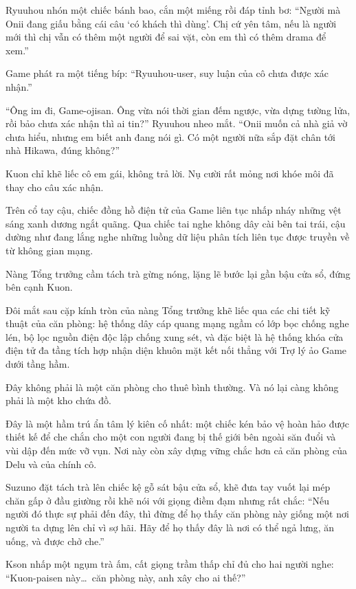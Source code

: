 ﻿\documentclass[../main.tex]{subfiles}
\begin{document}
Ryuuhou nhón một chiếc bánh bao, cắn một miếng rồi đáp tỉnh bơ: ``Người mà Onii đang giấu bằng cái câu `có khách thì dùng'. Chị cứ yên tâm, nếu là người mới thì chị vẫn có thêm một người để sai vặt, còn em thì có thêm drama để xem.''

Game phát ra một tiếng bíp: ``Ryuuhou-user, suy luận của cô chưa được xác nhận.''

``Ông im đi, Game-ojisan. Ông vừa nói thời gian đếm ngược, vừa dựng tường lửa, rồi bảo chưa xác nhận thì ai tin?'' Ryuuhou nheo mắt. ``Onii muốn cả nhà giả vờ chưa hiểu, nhưng em biết anh đang nói gì. Có một người nữa sắp đặt chân tới nhà Hikawa, đúng không?''

Kuon chỉ khẽ liếc cô em gái, không trả lời. Nụ cười rất mỏng nơi khóe môi đã thay cho câu xác nhận.

Trên cổ tay cậu, chiếc đồng hồ điện tử của Game liên tục nhấp nháy những vệt sáng xanh dương ngắt quãng. Qua chiếc tai nghe không dây cài bên tai trái, cậu dường như đang lắng nghe những luồng dữ liệu phân tích liên tục được truyền về từ không gian mạng.

Nàng Tổng trưởng cầm tách trà gừng nóng, lặng lẽ bước lại gần bậu cửa sổ, đứng bên cạnh Kuon.

Đôi mắt sau cặp kính tròn của nàng Tổng trưởng khẽ liếc qua các chi tiết kỹ thuật của căn phòng: hệ thống dây cáp quang mạng ngầm có lớp bọc chống nghe lén, bộ lọc nguồn điện độc lập chống xung sét, và đặc biệt là hệ thống khóa cửa điện tử đa tầng tích hợp nhận diện khuôn mặt kết nối thẳng với Trợ lý ảo Game dưới tầng hầm.

Đây không phải là một căn phòng cho thuê bình thường. Và nó lại càng không phải là một kho chứa đồ.

Đây là một hầm trú ẩn tâm lý kiên cố nhất: một chiếc kén bảo vệ hoàn hảo được thiết kế để che chắn cho một con người đang bị thế giới bên ngoài săn đuổi và vùi dập đến mức vỡ vụn. Nơi này còn xây dựng vững chắc hơn cả căn phòng của Delu và của chính cô.

Suzuno đặt tách trà lên chiếc kệ gỗ sát bậu cửa sổ, khẽ đưa tay vuốt lại mép chăn gấp ở đầu giường rồi khẽ nói với giọng điềm đạm nhưng rất chắc: ``Nếu người đó thực sự phải đến đây, thì đừng để họ thấy căn phòng này giống một nơi người ta dựng lên chỉ vì sợ hãi. Hãy để họ thấy đây là nơi có thể ngả lưng, ăn uống, và được chở che.''

Kson nhấp một ngụm trà ấm, cất giọng trầm thấp chỉ đủ cho hai người nghe: ``Kuon-paisen này\dots\ căn phòng này, anh xây cho ai thế?''
\end{document}
